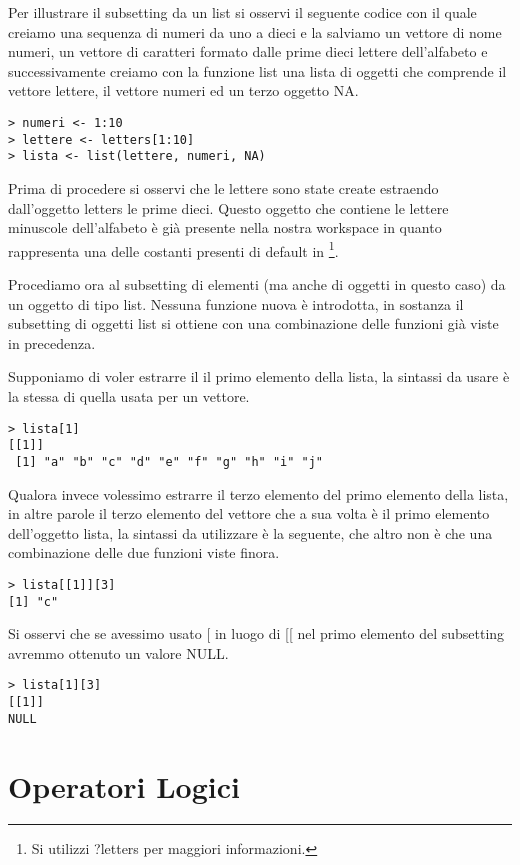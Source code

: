 Per illustrare il subsetting da un list si osservi il seguente codice con il quale creiamo una sequenza di numeri da uno a dieci e la salviamo un vettore di nome \textsf{numeri}, un vettore di caratteri formato dalle prime dieci lettere dell'alfabeto e successivamente creiamo con la funzione \textsf{list} una lista di oggetti che comprende il vettore lettere, il vettore numeri ed un terzo oggetto NA.

\begin{lstlisting}
> numeri <- 1:10
> lettere <- letters[1:10]
> lista <- list(lettere, numeri, NA)
\end{lstlisting}

Prima di procedere si osservi che le lettere sono state create estraendo dall'oggetto \textsf{letters} le prime dieci. Questo oggetto che contiene le lettere minuscole dell'alfabeto è già presente nella nostra workspace in quanto rappresenta una delle costanti presenti di default in \erre\footnote{Si utilizzi ?letters per maggiori informazioni.}.

Procediamo ora al subsetting di elementi (ma anche di oggetti in questo caso) da un oggetto di tipo list. Nessuna funzione nuova è introdotta, in sostanza il subsetting di oggetti list si ottiene con una combinazione delle funzioni già viste in precedenza.

Supponiamo di voler estrarre il il primo elemento della lista, la sintassi da usare è la stessa di quella usata per un vettore.
\begin{lstlisting}
> lista[1]
[[1]]
 [1] "a" "b" "c" "d" "e" "f" "g" "h" "i" "j"
\end{lstlisting}
 
Qualora invece volessimo estrarre il terzo elemento del primo elemento della lista, in altre parole il terzo elemento del vettore che a sua volta è il primo elemento dell'oggetto lista, la sintassi da utilizzare è la seguente, che altro non è che una combinazione delle due funzioni viste finora.
\begin{lstlisting}
> lista[[1]][3]
[1] "c"
\end{lstlisting}

Si osservi che se avessimo usato \textsf{[} in luogo di \textsf{[[} nel primo elemento del subsetting avremmo ottenuto un valore NULL.
\begin{lstlisting}
> lista[1][3]
[[1]]
NULL
\end{lstlisting}
\section{Operatori Logici}